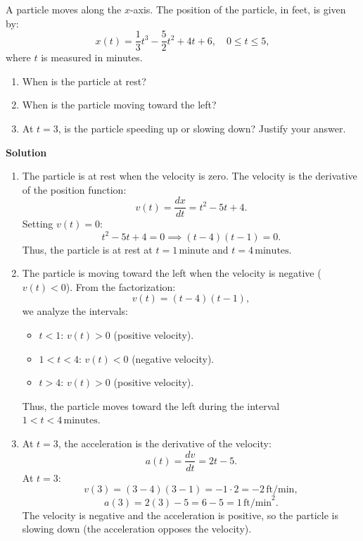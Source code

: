 \documentclass[12pt]{article}
\theoremstyle{beautifulthm}
\begin{document}
\begin{tcolorbox}[colback=examplebg, colframe=red!75!black, title=\textbf{EXAMPLE 1:  Position of a particle}, fonttitle=\bfseries, sharp corners]
A particle moves along the \( x \)-axis. The position of the particle, in feet, is given by:
\[
x(t) = \frac{1}{3}t^3 - \frac{5}{2}t^2 + 4t + 6, \quad 0 \leq t \leq 5,
\]
where \( t \) is measured in minutes.
\begin{enumerate}
    \item[(a)] When is the particle at rest?
    \item[(b)] When is the particle moving toward the left?
    \item[(c)] At \( t = 3 \), is the particle speeding up or slowing down? Justify your answer.
\end{enumerate}
\tcblower
\textbf{Solution}
\begin{enumerate}
    \item[(a)] The particle is at rest when the velocity is zero. The velocity is the derivative of the position function:
    \[
    v(t) = \frac{dx}{dt} = t^2 - 5t + 4.
    \]
    Setting \( v(t) = 0 \):
    \[
    t^2 - 5t + 4 = 0 \implies (t - 4)(t - 1) = 0.
    \]
    Thus, the particle is at rest at \( t = 1 \, \text{minute} \) and \( t = 4 \, \text{minutes.} \)

    \item[(b)] The particle is moving toward the left when the velocity is negative (\( v(t) < 0 \)). From the factorization:
    \[
    v(t) = (t - 4)(t - 1),
    \]
    we analyze the intervals:
    \begin{itemize}
        \item \( t < 1 \): \( v(t) > 0 \) (positive velocity).
        \item \( 1 < t < 4 \): \( v(t) < 0 \) (negative velocity).
        \item \( t > 4 \): \( v(t) > 0 \) (positive velocity).
    \end{itemize}
    Thus, the particle moves toward the left during the interval \( 1 < t < 4 \, \text{minutes.} \)

    \item[(c)] At \( t = 3 \), the acceleration is the derivative of the velocity:
    \[
    a(t) = \frac{dv}{dt} = 2t - 5.
    \]
    At \( t = 3 \):
    \[
    v(3) = (3 - 4)(3 - 1) = -1 \cdot 2 = -2 \, \text{ft/min},
    \]
    \[
    a(3) = 2(3) - 5 = 6 - 5 = 1 \, \text{ft/min}^2.
    \]
    The velocity is negative and the acceleration is positive, so the particle is slowing down (the acceleration opposes the velocity).
\end{enumerate}




\end{tcolorbox}
\end{document}
